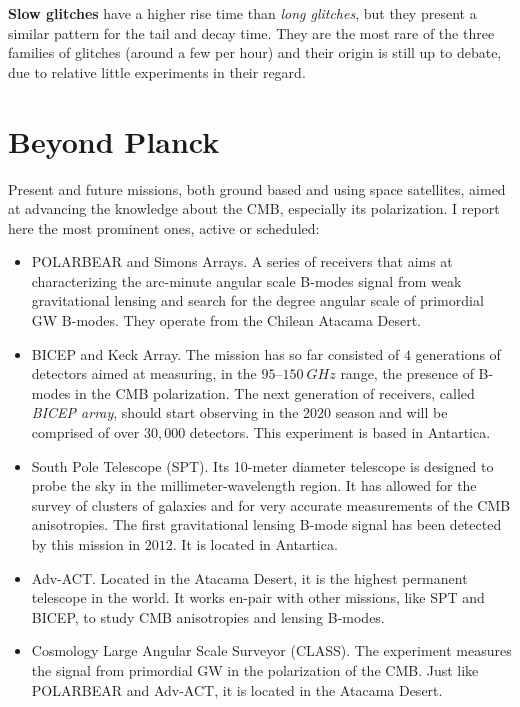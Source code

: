 \documentclass[12pt,a4paper,final]{book}			%
\begin{document}
				\textbf{Slow glitches} have a higher rise time than \textit{long glitches}, but they present a similar pattern for the tail and decay time. They are the most rare of the three families of glitches (around a few per hour) and their origin is still up to debate, due to relative little experiments in their regard. 	
			
		\section{Beyond Planck}
			
			Present and future missions, both ground based and using space satellites, aimed at advancing the knowledge about the CMB, especially its polarization. I report here the most prominent ones, active or scheduled:
			\begin{itemize}
				\item POLARBEAR and Simons Arrays. A series of receivers that aims at characterizing the arc-minute angular scale B-modes signal from weak gravitational lensing and search for the degree angular scale of primordial GW B-modes. They operate from the Chilean Atacama Desert.\cite{POLARBEAR} 
				
				\item BICEP and Keck Array. The mission has so far consisted of $4$ generations of detectors aimed at measuring, in the $95–150~\unit{GHz}$ range, the presence of B-modes in the CMB polarization. The next generation of receivers, called \textit{BICEP array}, should start observing in the 2020 season and will be comprised of over $30,000$ detectors. This experiment is based in Antartica. \cite{BICEP}
				
				\item South Pole Telescope (SPT). Its 10-meter diameter telescope is designed to probe the sky in the millimeter-wavelength region. It has allowed for the survey of clusters of galaxies and for very accurate measurements of the CMB anisotropies. The first gravitational lensing B-mode signal has been detected by this mission in $2012$. It is located in Antartica. \cite{SPT}
				
				\item Adv-ACT. Located in the Atacama Desert, it is the highest permanent telescope in the world. It works en-pair with other missions, like SPT and BICEP, to study CMB anisotropies and lensing B-modes.
				
				\item Cosmology Large Angular Scale Surveyor (CLASS). The experiment measures the signal from primordial GW in the polarization of the CMB. Just like POLARBEAR and Adv-ACT, it is located in the Atacama Desert. \cite{CLASS}
				

\end{itemize}
\end{document}
